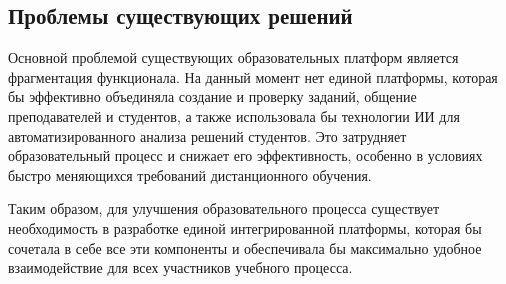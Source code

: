 \subsection{Проблемы существующих решений}
Основной проблемой существующих образовательных платформ является фрагментация функционала. На данный момент нет единой платформы, которая бы эффективно объединяла создание и проверку заданий, общение преподавателей и студентов, а также использовала бы технологии ИИ для автоматизированного анализа решений студентов. Это затрудняет образовательный процесс и снижает его эффективность, особенно в условиях быстро меняющихся требований дистанционного обучения.

Таким образом, для улучшения образовательного процесса существует необходимость в разработке единой интегрированной платформы, которая бы сочетала в себе все эти компоненты и обеспечивала бы максимально удобное взаимодействие для всех участников учебного процесса.
